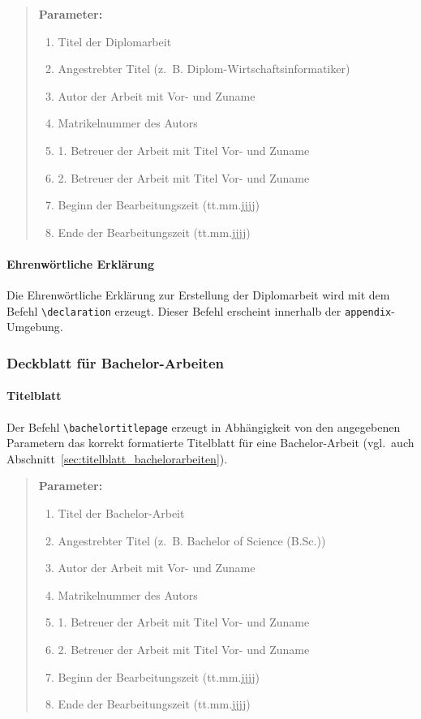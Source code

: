 \documentclass[english, trackchanges, hyperref, ngerman ,pdf, mp, mppdf]{wise}
\newcommand\code[1]{\texttt{#1}}
\newcommand\command[1]{\code{\textbackslash{}#1}}
\begin{document}
\begin{quotation}
\noindent \textbf{Parameter:}
\begin{enumerate}
\item Titel der Diplomarbeit
\item Angestrebter Titel (z.~B. Diplom-Wirtschaftsinformatiker)
\item Autor der Arbeit mit Vor- und Zuname
\item Matrikelnummer des Autors
\item 1. Betreuer der Arbeit mit Titel Vor- und Zuname
\item 2. Betreuer der Arbeit mit Titel Vor- und Zuname
\item Beginn der Bearbeitungszeit (tt.mm.jjjj)
\item Ende der Bearbeitungszeit (tt.mm.jjjj)
\end{enumerate}
\end{quotation}

\paragraph{Ehrenwörtliche Erklärung}

Die Ehrenwörtliche Erklärung zur Erstellung der Diplomarbeit wird
mit dem Befehl \command{declaration} erzeugt. Dieser
Befehl erscheint innerhalb der \code{appendix}-Umgebung.

\subsubsection{Deckblatt für Bachelor-Arbeiten}


\paragraph{Titelblatt}

Der Befehl \command{bachelortitlepage} erzeugt in Abhängigkeit
von den angegebenen Parametern das korrekt formatierte Titelblatt
für eine Bachelor-Arbeit (vgl.\ auch Abschnitt~\ref{sec:titelblatt_bachelorarbeiten}).

\begin{quotation}
\noindent \textbf{Parameter:}
\begin{enumerate}
\item Titel der Bachelor-Arbeit
\item Angestrebter Titel (z.~B. Bachelor of Science (B.Sc.))
\item Autor der Arbeit mit Vor- und Zuname
\item Matrikelnummer des Autors
\item 1. Betreuer der Arbeit mit Titel Vor- und Zuname
\item 2. Betreuer der Arbeit mit Titel Vor- und Zuname
\item Beginn der Bearbeitungszeit (tt.mm.jjjj)
\item Ende der Bearbeitungszeit (tt.mm.jjjj)
\end{enumerate}
\end{quotation}
\end{document}
